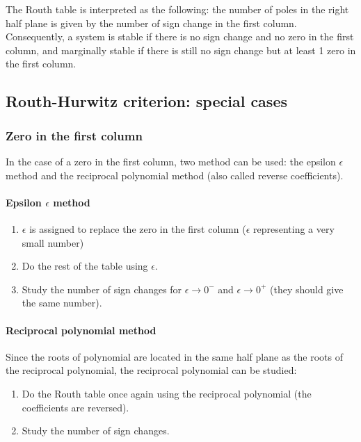 \documentclass[10pt, twocolumn]{article}
\begin{document}
The Routh table is interpreted as the following: the number of poles in the right half plane is given by the number of sign change in the first column.
Consequently, a system is stable if there is no sign change and no zero in the first column, and marginally stable if there is still no sign change but at least 1 zero in the first column.


\subsection{Routh-Hurwitz criterion: special cases}
\subsubsection{Zero in the first column}
In the case of a zero in the first column, two method can be used: the epsilon \(\epsilon\) method and the reciprocal polynomial method (also called reverse coefficients).

\paragraph{Epsilon \(\epsilon\) method}
\begin{enumerate}
  \item \(\epsilon\) is assigned to replace the zero in the first column (\(\epsilon\) representing a very small number)
  \item Do the rest of the table using \(\epsilon\).
  \item Study the number of sign changes for \(\epsilon \to 0^-\) and \(\epsilon \to 0^+\) (they should give the same number).
\end{enumerate}


\paragraph{Reciprocal polynomial method}
Since the roots of polynomial are located in the same half plane as the roots of the reciprocal polynomial, the reciprocal polynomial can be studied:
\begin{enumerate}
  \item Do the Routh table once again using the reciprocal polynomial (the coefficients are reversed).
  \item Study the number of sign changes.
\end{enumerate}
\end{document}
